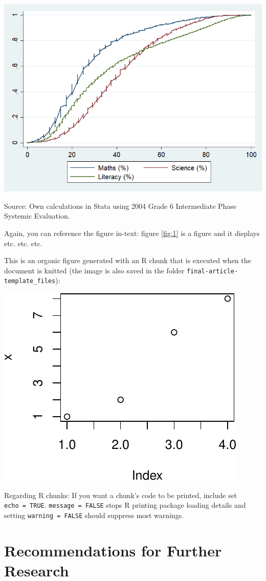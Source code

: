 \documentclass[11pt,preprint, authoryear]{article}
\let\origfigure\figure
\let\endorigfigure\endfigure
\renewenvironment{figure}[1][2] {
    \expandafter\origfigure\expandafter[H]
} {
    \endorigfigure
}
\numberwithin{equation}{section}
\numberwithin{figure}{section}
\numberwithin{table}{section}
\begin{document}
\normalsize

\setcounter{figure}{0} \renewcommand{\thefigure}{\arabic{figure}}

\begin{figure}
\caption{\textbf{\footnotesize Cumulative graph for subject scores}}
\label{fig:1}

\begin{center}\includegraphics[width=0.4\linewidth]{./results/graphs/figure} \end{center}
\centering
{\footnotesize Source: Own calculations in Stata using 2004 Grade 6 Intermediate Phase Systemic Evaluation.}
\end{figure}

\normalsize

Again, you can reference the figure in-text: figure \ref{fig:1} is a
figure and it displays etc. etc. etc.

This is an organic figure generated with an R chunk that is executed
when the document is knitted (the image is also saved in the folder
\texttt{final-article-template\_files}):

\begin{center}\includegraphics[width=0.4\linewidth]{final-msc-article_files/figure-latex/unnamed-chunk-2-1} \end{center}

Regarding R chunks: If you want a chunk's code to be printed, include
set \texttt{echo\ =\ TRUE}. \texttt{message\ =\ FALSE} stops R printing
package loading details and setting \texttt{warning\ =\ FALSE} should
suppress most warnings.

\newpage

\section{\texorpdfstring{Recommendations for Further Research
\label{Recom}}{Recommendations for Further Research }}\label{recommendations-for-further-research}
\end{document}
